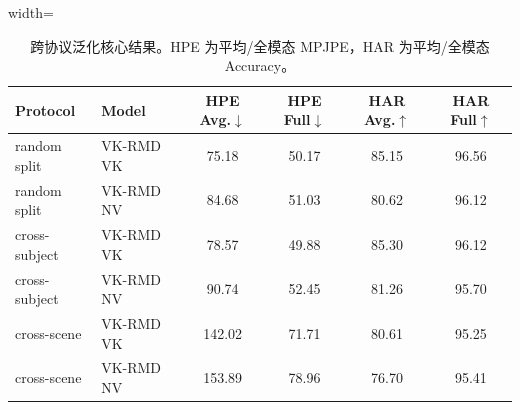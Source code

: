 \begin{table}[t]
\centering
\caption{跨协议泛化核心结果。HPE 为平均/全模态 MPJPE，HAR 为平均/全模态 Accuracy。}
\label{tab:protocol_cn}
\scriptsize
\begin{adjustbox}{width=\textwidth}
\begin{tabular}{llcccc}
\toprule
Protocol & Model & HPE Avg.$\downarrow$ & HPE Full$\downarrow$ & HAR Avg.$\uparrow$ & HAR Full$\uparrow$ \\
\midrule
random split & VK-RMD VK & 75.18 & 50.17 & 85.15 & 96.56 \\
random split & VK-RMD NV & 84.68 & 51.03 & 80.62 & 96.12 \\
\midrule
cross-subject & VK-RMD VK & 78.57 & 49.88 & 85.30 & 96.12 \\
cross-subject & VK-RMD NV & 90.74 & 52.45 & 81.26 & 95.70 \\
\midrule
cross-scene & VK-RMD VK & 142.02 & 71.71 & 80.61 & 95.25 \\
cross-scene & VK-RMD NV & 153.89 & 78.96 & 76.70 & 95.41 \\
\bottomrule
\end{tabular}
\end{adjustbox}
\end{table}
